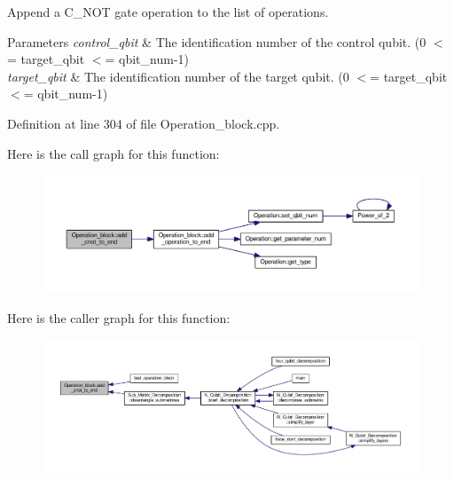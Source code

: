 Append a C\+\_\+\+N\+OT gate operation to the list of operations. 


\begin{DoxyParams}{Parameters}
{\em control\+\_\+qbit} & The identification number of the control qubit. (0 $<$= target\+\_\+qbit $<$= qbit\+\_\+num-\/1) \\
\hline
{\em target\+\_\+qbit} & The identification number of the target qubit. (0 $<$= target\+\_\+qbit $<$= qbit\+\_\+num-\/1) \\
\hline
\end{DoxyParams}


Definition at line 304 of file Operation\+\_\+block.\+cpp.



Here is the call graph for this function\+:
\nopagebreak
\begin{figure}[H]
\begin{center}
\leavevmode
\includegraphics[width=350pt]{class_operation__block_a3779e559654f12c5544129c46305b6ce_cgraph}
\end{center}
\end{figure}




Here is the caller graph for this function\+:
\nopagebreak
\begin{figure}[H]
\begin{center}
\leavevmode
\includegraphics[width=350pt]{class_operation__block_a3779e559654f12c5544129c46305b6ce_icgraph}
\end{center}
\end{figure}


